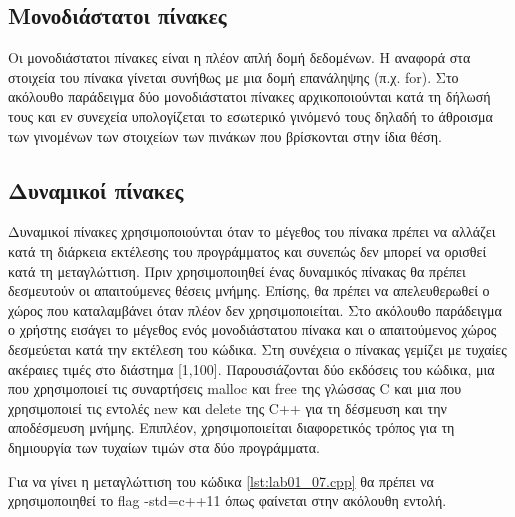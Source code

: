 \subsection{Μονοδιάστατοι πίνακες}
Οι μονοδιάστατοι πίνακες είναι η πλέον απλή δομή δεδομένων. Η αναφορά στα στοιχεία του πίνακα γίνεται συνήθως με μια δομή επανάληψης (π.χ. for). Στο ακόλουθο παράδειγμα δύο μονοδιάστατοι πίνακες αρχικοποιούνται κατά τη δήλωσή τους και εν συνεχεία υπολογίζεται το εσωτερικό γινόμενό τους δηλαδή το άθροισμα των γινομένων των στοιχείων των πινάκων που βρίσκονται στην ίδια θέση.






\subsection{Δυναμικοί πίνακες}
Δυναμικοί πίνακες χρησιμοποιούνται όταν το μέγεθος του πίνακα πρέπει να αλλάζει κατά τη διάρκεια εκτέλεσης του προγράμματος και συνεπώς δεν μπορεί να ορισθεί κατά τη μεταγλώττιση. Πριν χρησιμοποιηθεί ένας δυναμικός πίνακας θα πρέπει δεσμευτούν οι απαιτούμενες θέσεις μνήμης. Επίσης, θα πρέπει να απελευθερωθεί ο χώρος που καταλαμβάνει όταν πλέον δεν χρησιμοποιείται. Στο ακόλουθο παράδειγμα ο χρήστης εισάγει το μέγεθος ενός μονοδιάστατου πίνακα και ο απαιτούμενος χώρος δεσμεύεται κατά την εκτέλεση του κώδικα. Στη συνέχεια ο πίνακας γεμίζει με τυχαίες ακέραιες τιμές στο διάστημα [1,100]. Παρουσιάζονται δύο εκδόσεις του κώδικα, μια που χρησιμοποιεί τις συναρτήσεις malloc και free της γλώσσας C και μια που χρησιμοποιεί τις εντολές new και delete της C++ για τη δέσμευση και την αποδέσμευση μνήμης. Επιπλέον, χρησιμοποιείται διαφορετικός τρόπος για τη δημιουργία των τυχαίων τιμών στα δύο προγράμματα.








Για να γίνει η μεταγλώττιση του κώδικα \ref{lst:lab01_07.cpp} θα πρέπει να χρησιμοποιηθεί το flag -std=c++11 όπως φαίνεται στην ακόλουθη εντολή.

